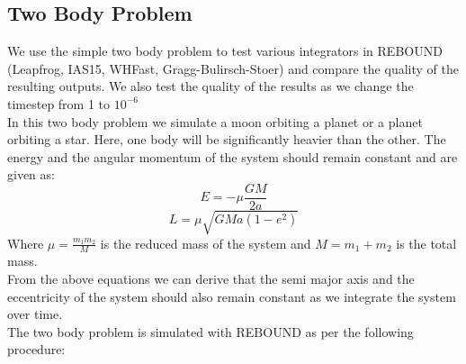 \documentclass[12pt,a4paper]{article}
\begin{document}
\subsection{Two Body Problem}
We use the simple two body problem to test various integrators in REBOUND (Leapfrog, IAS15, WHFast, Gragg-Bulirsch-Stoer) and compare the quality of the resulting outputs.
We also test the quality of the results as we change the timestep from 1 to $10^{-6}$\\
In this two body problem we simulate a moon orbiting a planet or a planet orbiting a star. Here, one body will be significantly heavier than the other. 
The energy and the angular momentum of the system should remain constant and are given as: 
\begin{equation}
   E = -\mu \frac{GM}{2a}
\end{equation}
\begin{equation}
  L = \mu \sqrt{GMa(1-e^2)}
\end{equation}
Where $\mu = \frac{m_1m_2}{M}$ is the reduced mass of the system and $M=m_1+m_2$ is the total mass.\\
From the above equations we can derive that the semi major axis and the eccentricity of the system should also remain constant as we integrate the system over time.\\
The two body problem is simulated with REBOUND as per the following procedure:
\end{document}
